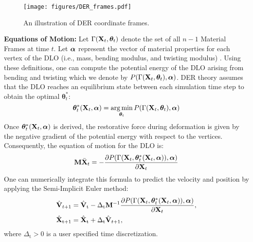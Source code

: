 \begin{figure}[t]
    \centering
     \texttt{[image: figures/DER\_frames.pdf]}
     \caption{An illustration of DER coordinate frames.}
    \label{fig:DER_frames}
\end{figure}

\textbf{Equations of Motion:}
Let $\Gamma(\mathbf{X}_t, \bm{\theta}_t)$ denote the set of all $n-1$ Material Frames at time $t$. 
Let $\bm{\alpha}$ represent the vector of material properties for each vertex of the DLO (i.e., mass, bending modulus, and twisting modulus) \cite[Section 4.2]{originalDER}.
Using these definitions, one can compute the potential energy of the DLO arising from bending and twisting which we denote by $P(\Gamma(\mathbf{X}_t, \bm{\theta}_t), \bm{\alpha})$. 
DER theory assumes that the DLO reaches an equilibrium state between each simulation time step to obtain the optimal $\bm{\theta}_t^*$:
\begin{equation} \bm{\theta}^*_t(\textbf{X}_t,\bm{\alpha}) = \operatorname*{arg\,min}_{\bm{\theta}_t} P(\Gamma(\mathbf{X}_t, \bm{\theta}_t), \bm{\alpha})
       \label{eq:opt_theta}
\end{equation}
 Once $\bm{\theta}^*_t(\mathbf{X}_t, \bm{\alpha})$ is derived, the restorative force during deformation is given by the negative gradient of the potential energy with respect to the vertices. 
 Consequently, the equation of motion for the DLO is:
\begin{equation}
       \mathbf{M} \ddot{\textbf{X}}_{t} = -\frac{\partial P(\Gamma(\textbf{X}_t, \bm{\theta}^*_t(\textbf{X}_t,\bm{\alpha})),\bm{\alpha})}{\partial  \textbf{X}_{t}}
       \label{eq:equationofmotion}
\end{equation}
One can numerically integrate this formula to predict the velocity and position by applying the Semi-Implicit Euler method:
\begin{align}
        \hat{\textbf{V}}_{t+1} &= \hat{\textbf{V}}_\text{t}-\Delta_\text{t}\mathbf{M}^{-1}\frac{\partial P(\Gamma(\textbf{X}_t, \bm{\theta}^*_t(\textbf{X}_t,\bm{\alpha})),\bm{\alpha})}{\partial  \textbf{X}_{t}}, \label{eq:Semi-Euler1}\\  
        \hat{\textbf{X}}_{\text{t}+1} &= \hat{\textbf{X}}_\text{t} + \Delta_\text{t}\hat{\textbf{V}}_{t+1},
       \label{eq:Semi-Euler2}
\end{align}
where $\Delta_{\text{t}} > 0$ is a user specified time discretization.


